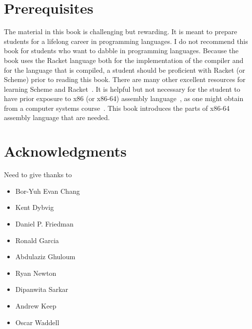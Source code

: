 \documentclass[11pt]{book}
\begin{document}
\section*{Prerequisites}

The material in this book is challenging but rewarding. It is meant to
prepare students for a lifelong career in programming languages.  I do
not recommend this book for students who want to dabble in programming
languages.  Because the book uses the Racket language both for the
implementation of the compiler and for the language that is compiled,
a student should be proficient with Racket (or Scheme) prior to
reading this book. There are many other excellent resources for
learning Scheme and
Racket~\citep{Dybvig:1987aa,Abelson:1996uq,Friedman:1996aa,Felleisen:2001aa,Felleisen:2013aa,Flatt:2014aa}. It
is helpful but not necessary for the student to have prior exposure to
x86 (or x86-64) assembly language~\citep{Intel:2015aa}, as one might
obtain from a computer systems
course~\citep{Bryant:2005aa,Bryant:2010aa}.  This book introduces the
parts of x86-64 assembly language that are needed.



\section*{Acknowledgments}

Need to give thanks to
\begin{itemize}
\item Bor-Yuh Evan Chang
\item Kent Dybvig
\item Daniel P. Friedman
\item Ronald Garcia
\item Abdulaziz Ghuloum
\item Ryan Newton
\item Dipanwita Sarkar
\item Andrew Keep
\item Oscar Waddell
\end{itemize}
\end{document}
